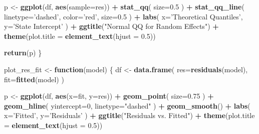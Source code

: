 \documentclass[
  11pt,
]{article}
\newenvironment{Shaded}{\begin{snugshade}}{\end{snugshade}}
\newcommand{\ControlFlowTok}[1]{\textcolor[rgb]{0.13,0.29,0.53}{\textbf{#1}}}
\newcommand{\DataTypeTok}[1]{\textcolor[rgb]{0.13,0.29,0.53}{#1}}
\newcommand{\DecValTok}[1]{\textcolor[rgb]{0.00,0.00,0.81}{#1}}
\newcommand{\FloatTok}[1]{\textcolor[rgb]{0.00,0.00,0.81}{#1}}
\newcommand{\KeywordTok}[1]{\textcolor[rgb]{0.13,0.29,0.53}{\textbf{#1}}}
\newcommand{\NormalTok}[1]{#1}
\newcommand{\OperatorTok}[1]{\textcolor[rgb]{0.81,0.36,0.00}{\textbf{#1}}}
\newcommand{\StringTok}[1]{\textcolor[rgb]{0.31,0.60,0.02}{#1}}
\begin{document}
\begin{Shaded}
\begin{Highlighting}[]
\NormalTok{  p <-}\StringTok{ }\KeywordTok{ggplot}\NormalTok{(df, }\KeywordTok{aes}\NormalTok{(}\DataTypeTok{sample=}\NormalTok{res)) }\OperatorTok{+}\StringTok{ }
\StringTok{    }\KeywordTok{stat_qq}\NormalTok{(}
      \DataTypeTok{size=}\FloatTok{0.5}
\NormalTok{    ) }\OperatorTok{+}\StringTok{ }
\StringTok{    }\KeywordTok{stat_qq_line}\NormalTok{(}
      \DataTypeTok{linetype=}\StringTok{'dashed'}\NormalTok{,}
      \DataTypeTok{color=}\StringTok{'red'}\NormalTok{,}
      \DataTypeTok{size=}\FloatTok{0.5}
\NormalTok{    ) }\OperatorTok{+}
\StringTok{    }\KeywordTok{labs}\NormalTok{(}
      \DataTypeTok{x=}\StringTok{'Theoretical Quantiles'}\NormalTok{,}
      \DataTypeTok{y=}\StringTok{'State Intercept'}
\NormalTok{    ) }\OperatorTok{+}\StringTok{ }
\StringTok{    }\KeywordTok{ggtitle}\NormalTok{(}\StringTok{"Normal QQ for Random Effects"}\NormalTok{) }\OperatorTok{+}
\StringTok{  }\KeywordTok{theme}\NormalTok{(}\DataTypeTok{plot.title =} \KeywordTok{element_text}\NormalTok{(}\DataTypeTok{hjust =} \FloatTok{0.5}\NormalTok{))}
  
  \KeywordTok{return}\NormalTok{(p)}
\NormalTok{\}}

\NormalTok{plot_res_fit <-}\StringTok{ }\ControlFlowTok{function}\NormalTok{(model) \{}
\NormalTok{  df <-}\StringTok{ }\KeywordTok{data.frame}\NormalTok{(}
    \DataTypeTok{res=}\KeywordTok{residuals}\NormalTok{(model),}
    \DataTypeTok{fit=}\KeywordTok{fitted}\NormalTok{(model)}
\NormalTok{  )}
  
\NormalTok{  p <-}\StringTok{ }\KeywordTok{ggplot}\NormalTok{(df, }\KeywordTok{aes}\NormalTok{(}\DataTypeTok{x=}\NormalTok{fit, }\DataTypeTok{y=}\NormalTok{res)) }\OperatorTok{+}
\StringTok{    }\KeywordTok{geom_point}\NormalTok{(}
      \DataTypeTok{size=}\FloatTok{0.75}
\NormalTok{    ) }\OperatorTok{+}
\StringTok{    }\KeywordTok{geom_hline}\NormalTok{(}
      \DataTypeTok{yintercept=}\DecValTok{0}\NormalTok{,}
      \DataTypeTok{linetype=}\StringTok{"dashed"}
\NormalTok{    ) }\OperatorTok{+}
\StringTok{    }\KeywordTok{geom_smooth}\NormalTok{() }\OperatorTok{+}
\StringTok{    }\KeywordTok{labs}\NormalTok{(}
      \DataTypeTok{x=}\StringTok{'Fitted'}\NormalTok{,}
      \DataTypeTok{y=}\StringTok{'Residuals'}
\NormalTok{    ) }\OperatorTok{+}\StringTok{ }
\StringTok{    }\KeywordTok{ggtitle}\NormalTok{(}\StringTok{"Residuals vs. Fitted"}\NormalTok{) }\OperatorTok{+}
\StringTok{  }\KeywordTok{theme}\NormalTok{(}\DataTypeTok{plot.title =} \KeywordTok{element_text}\NormalTok{(}\DataTypeTok{hjust =} \FloatTok{0.5}\NormalTok{))}
  

\end{Highlighting}
\end{Shaded}
\end{document}

